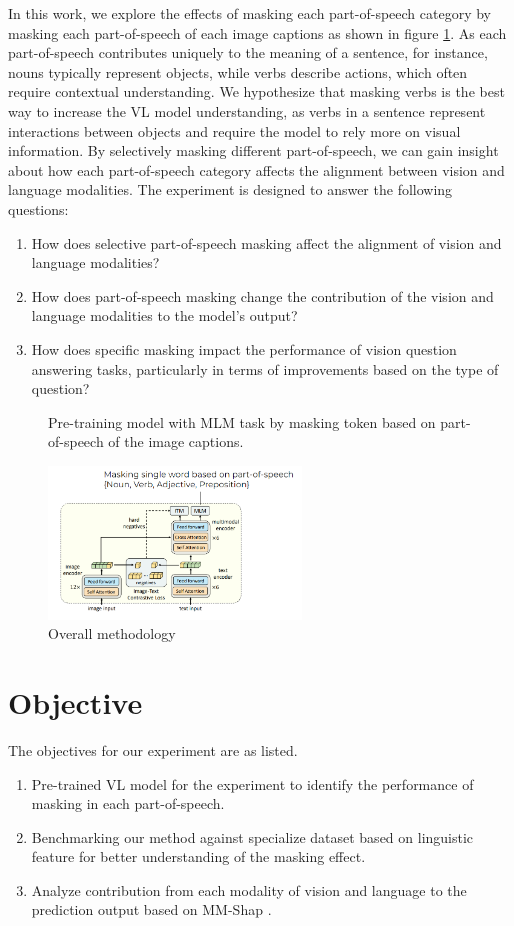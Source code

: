 In this work, we explore the effects of masking each part-of-speech category by masking each part-of-speech of each image captions as shown in figure \ref{fig:overview}. 
As each part-of-speech contributes uniquely to the meaning of a sentence, for instance, nouns typically represent objects, while verbs describe actions, which often require contextual understanding. 
We hypothesize that masking verbs is the best way to increase the VL model understanding, as verbs in a sentence represent interactions between objects and require the model to rely more on visual information.
By selectively masking different part-of-speech, we can gain insight about how each part-of-speech category affects the alignment between vision and language modalities. 
The experiment is designed to answer the following questions:
\begin{enumerate}
    \item How does selective part-of-speech masking affect the alignment of vision and language modalities?
    \item How does part-of-speech masking change the contribution of the vision and language modalities to the model's output?
    \item How does specific masking impact the performance of vision question answering tasks, particularly in terms of improvements based on the type of question?
\end{enumerate}

\begin{figure}[h]
    \caption{Overall methodology}
    \label{fig:overview}
    Pre-training model with MLM task by masking token based on part-of-speech of the image captions.
    \begin{center}
        \includegraphics[width=0.6\textwidth]{Images/overview.png}
    \end{center}
    \small
\end{figure}

\section{Objective}
The objectives for our experiment are as listed.
\begin{enumerate}
    \item Pre-trained VL model for the experiment to identify the performance of masking in each part-of-speech.
    \item Benchmarking our method against specialize dataset based on linguistic feature \cite{valse} for better understanding of the masking effect.
    \item Analyze contribution from each modality of vision and language to the prediction output based on MM-Shap \cite{mm-shap}.
\end{enumerate}

